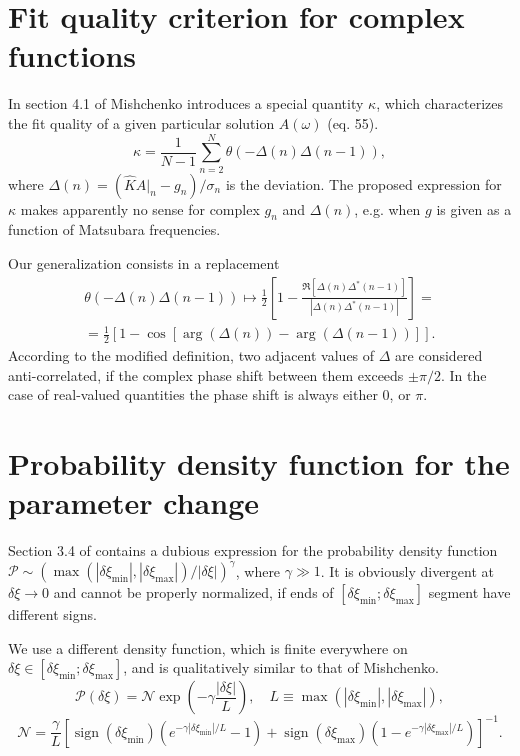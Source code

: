 \documentclass[]{article}
\DeclareMathOperator{\sign}{sign}
\begin{document}
\section{Fit quality criterion for complex functions}
\label{fit_quality}

In section 4.1 of \cite{som_lecture} Mishchenko introduces a special quantity $\kappa$, which characterizes the fit quality of a given particular solution
$A(\omega)$ (eq. 55).
\begin{equation}
	\kappa = \frac{1}{N-1}\sum_{n=2}^N\theta(-\Delta(n)\Delta(n-1)),
\end{equation}
where $\Delta(n) = (\hat K A|_n - g_n)/\sigma_n$ is the deviation. The proposed expression for $\kappa$ makes  apparently no sense for complex $g_n$ and $\Delta(n)$, e.g. when $g$ is given as a function of Matsubara frequencies.

Our generalization consists in a replacement
\begin{multline}
	\theta(-\Delta(n)\Delta(n-1)) \mapsto
	\frac{1}{2}\left[1 - \frac{\Re[\Delta(n)\Delta^*(n-1)]}{|\Delta(n)\Delta^*(n-1)|} \right]=\\=
	\frac{1}{2}\left[ 1 - \cos[\arg(\Delta(n)) - \arg(\Delta(n-1))] \right].
\end{multline}
According to the modified definition, two adjacent values of $\Delta$ are considered anti-correlated, if the complex phase shift between them exceeds $\pm\pi/2$. In the case of real-valued quantities the phase shift is always either 0, or $\pi$.

\section{Probability density function for the parameter change}
\label{prob_function}

Section 3.4 of \cite{som_lecture} contains a dubious expression for the probability
density function $\mathcal{P}\sim (\max(|\delta\xi_\mathrm{min}|, |\delta\xi_\mathrm{max}|)/|\delta\xi|)^\gamma$, where $\gamma\gg1$. It is
obviously divergent at $\delta\xi\to0$ and cannot be properly normalized, if
ends of $[\delta\xi_\mathrm{min};\delta\xi_\mathrm{max}]$ segment have different signs.

We use a different density function, which is finite everywhere on $\delta\xi\in[\delta\xi_\mathrm{min};\delta\xi_\mathrm{max}]$, and is qualitatively similar to that of Mishchenko.
\begin{equation}
	\mathcal{P}(\delta\xi) = \mathcal{N}
	\exp\left(-\gamma \frac{|\delta\xi|}{L}\right), \quad
	L \equiv \max(|\delta\xi_\mathrm{min}|, |\delta\xi_\mathrm{max}|),
\end{equation}
\begin{equation}
	\mathcal{N} = \frac{\gamma}{L}\left[
		\sign(\delta\xi_\mathrm{min})(e^{-\gamma|\delta\xi_\mathrm{min}|/L} - 1) +
		\sign(\delta\xi_\mathrm{max})(1 - e^{-\gamma|\delta\xi_\mathrm{max}|/L})
	\right]^{-1}.
\end{equation}
\end{document}
